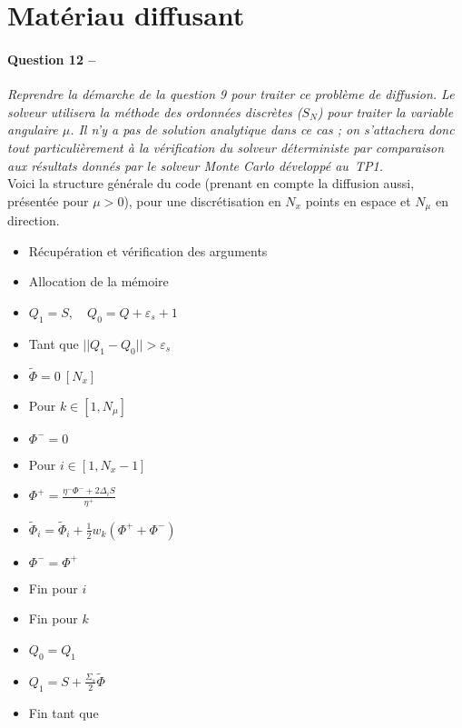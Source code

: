 \documentclass[11pt,a4paper]{article}
\newcommand{\norm}[1]{\big|\big|#1\big|\big|}
\newcommand{\question}[2]{\paragraph{Question #1 --}\hspace{-7pt}\textit{#2} \\}
\newcommand{\Phit}{\widetilde{\Phi}}
\begin{document}
\section{Matériau diffusant}

\question{12}{Reprendre la démarche de la question 9 pour traiter ce problème de diffusion.
Le solveur utilisera la méthode des ordonnées discrètes ($S_N$) pour traiter la variable angulaire $\mu$.
Il n'y a pas de solution analytique dans ce cas ; on s'attachera donc tout particulièrement à la vérification du solveur déterministe par comparaison aux résultats donnés par le solveur Monte Carlo développé au~TP1.}

Voici la structure générale du code (prenant en compte la diffusion aussi, présentée pour $\mu>0$), pour une discrétisation en $N_x$ points en espace et $N_{\mu}$ en direction.

\begin{itemize}
\item Récupération et vérification des arguments
\item Allocation de la mémoire
\item $Q_1 = S, \quad Q_0 = Q + \varepsilon_s +1$
\item[\textcolor{red}{\textbullet}] Tant que $\norm{Q_1 - Q_0}>\varepsilon_s$
  \setlength\itemindent{35pt}
\item $\Phit=0~[N_x]$
\item[\textcolor{red}{\textbullet}] Pour $k\in[1,N_{\mu}]$
  \setlength\itemindent{70pt}
\item $\Phi^- = 0$
\item[\textcolor{red}{\textbullet}] Pour $i\in[1, N_x-1]$
  \setlength\itemindent{105pt}
\item $\Phi^+ = \frac{\eta^- \Phi^- + 2 \Delta_i S}{\eta^+}$
\item $\Phit_i =  \Phit_i + \frac{1}{2} w_k (\Phi^+ + \Phi^-)$
\item $\Phi^- = \Phi^+$
  \setlength\itemindent{70pt}
\item[\textcolor{red}{\textbullet}] Fin pour $i$
   \setlength\itemindent{35pt}
\item[\textcolor{red}{\textbullet}] Fin pour $k$ 
\item $Q_0 = Q_1$
\item $Q_1 = S + \frac{\Sigma_s}{2} \Phit$
   \setlength\itemindent{0pt}
\item[\textcolor{red}{\textbullet}] Fin tant que  
\end{itemize}
 
\end{document}
